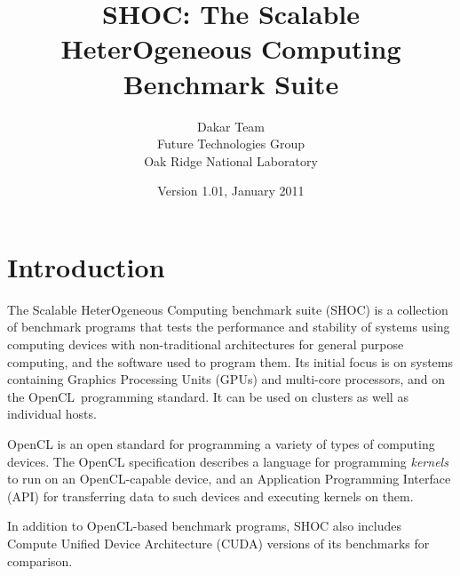 \documentclass[11pt]{article}
\begin{document}
\title{SHOC: The Scalable HeterOgeneous Computing Benchmark Suite}
\author{Dakar Team\\Future Technologies Group\\Oak Ridge National Laboratory}
\date{Version 1.01, January 2011}
\maketitle

\section{Introduction}

The Scalable HeterOgeneous Computing benchmark suite (SHOC) is a collection of
benchmark programs that tests the performance and stability of systems using 
computing devices with non-traditional architectures for general purpose 
computing, and the software used to program them. Its initial focus is on 
systems containing Graphics Processing Units (GPUs) and multi-core 
processors, and on the OpenCL\,\cite{openclspec} programming standard.
It can be used on clusters as well as individual hosts.

OpenCL is an open standard for programming a variety of types of computing 
devices. The OpenCL specification describes a language for programming 
\emph{kernels} to run on an OpenCL-capable device, and an 
Application Programming Interface (API) for transferring data to such 
devices and executing kernels on them. 


In addition to OpenCL-based benchmark programs, SHOC also includes
Compute Unified Device Architecture (CUDA)\cite{cuda} versions
of its benchmarks for comparison.


\end{document}
